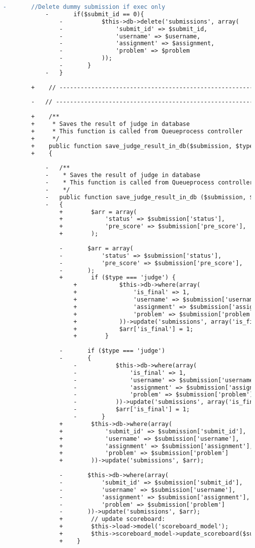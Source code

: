 \begin{lstlisting}[language=diff, caption=Perubahan pada kode Queue\_model.php]
			-		//Delete dummy submission if exec only
			-		if($submit_id == 0){
				-			$this->db->delete('submissions', array(
				-				'submit_id' => $submit_id,
				-				'username' => $username,
				-				'assignment' => $assignment,
				-				'problem' => $problem
				-			));
				-		}
			-	}
		
		+    // ------------------------------------------------------------------------
		
		-	// ------------------------------------------------------------------------
		
		+    /**
		+     * Saves the result of judge in database
		+     * This function is called from Queueprocess controller
		+     */
		+    public function save_judge_result_in_db($submission, $type)
		+    {
			
			-	/**
			-	 * Saves the result of judge in database
			-	 * This function is called from Queueprocess controller
			-	 */
			-	public function save_judge_result_in_db ($submission, $type)
			-	{
				+        $arr = array(
				+            'status' => $submission['status'],
				+            'pre_score' => $submission['pre_score'],
				+        );
				
				-		$arr = array(
				-			'status' => $submission['status'],
				-			'pre_score' => $submission['pre_score'],
				-		);
				+        if ($type === 'judge') {
					+            $this->db->where(array(
					+                'is_final' => 1,
					+                'username' => $submission['username'],
					+                'assignment' => $submission['assignment'],
					+                'problem' => $submission['problem'],
					+            ))->update('submissions', array('is_final' => 0));
					+            $arr['is_final'] = 1;
					+        }
				
				-		if ($type === 'judge')
				-		{
					-			$this->db->where(array(
					-				'is_final' => 1,
					-				'username' => $submission['username'],
					-				'assignment' => $submission['assignment'],
					-				'problem' => $submission['problem'],
					-			))->update('submissions', array('is_final'=>0));
					-			$arr['is_final'] = 1;
					-		}
				+        $this->db->where(array(
				+            'submit_id' => $submission['submit_id'],
				+            'username' => $submission['username'],
				+            'assignment' => $submission['assignment'],
				+            'problem' => $submission['problem']
				+        ))->update('submissions', $arr);
				
				-		$this->db->where(array(
				-			'submit_id' => $submission['submit_id'],
				-			'username' => $submission['username'],
				-			'assignment' => $submission['assignment'],
				-			'problem' => $submission['problem']
				-		))->update('submissions', $arr);
				+        // update scoreboard:
				+        $this->load->model('scoreboard_model');
				+        $this->scoreboard_model->update_scoreboard($submission['assignment']);
				+    }
			

\end{lstlisting}
